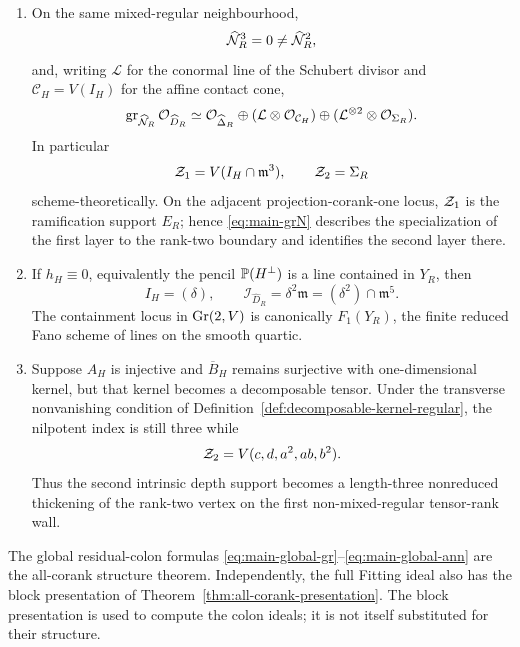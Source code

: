 \begin{theorem}
\begin{enumerate}
\item On the same mixed-regular neighbourhood,
\[
 \widehat{\mathcal N}_R^3=0\ne\widehat{\mathcal N}_R^2,
\]
and, writing \(\mathcal L\) for the conormal line of the Schubert
divisor and \(\mathcal C_H=V(I_H)\) for the affine contact cone,
\begin{equation}\label{eq:main-grN}
 \operatorname{gr}_{\widehat{\mathcal N}_R}\mathcal O_{\widehat D_R}
 \simeq
 \mathcal O_{\widehat\Delta_R}
 \oplus
 (\mathcal L\otimes\mathcal O_{\mathcal C_H})
 \oplus
 (\mathcal L^{\otimes2}\otimes\mathcal O_{\Sigma_R}).
\end{equation}
In particular
\[
 \mathcal Z_1=
 V(I_H\cap\mathfrak m^3),\qquad
 \mathcal Z_2=\Sigma_R
\]
scheme-theoretically.  On the adjacent projection-corank-one locus,
\(\mathcal Z_1\) is the ramification support \(E_R\); hence
\eqref{eq:main-grN} describes the specialization of the first layer
to the rank-two boundary and identifies the second layer there.

\item If \(h_H\equiv0\), equivalently the pencil
\(\mathbb P(H^\perp)\) is a line contained in \(Y_R\), then
\begin{equation}\label{eq:main-containment}
 I_H=(\delta),\qquad
 \mathcal I_{\widehat D_R}
 =\delta^2\mathfrak m
 =(\delta^2)\cap\mathfrak m^5.
\end{equation}
The containment locus in \(\operatorname{Gr}(2,V)\) is canonically
\(F_1(Y_R)\), the finite reduced Fano scheme of lines on the smooth
quartic.

\item Suppose \(A_H\) is injective and \(\overline B_H\) remains
surjective with one-dimensional kernel, but that kernel becomes a
decomposable tensor.  Under the transverse nonvanishing condition of
Definition~\ref{def:decomposable-kernel-regular}, the nilpotent index
is still three while
\[
 \mathcal Z_2=
 V(c,d,a^2,ab,b^2).
\]
Thus the second intrinsic depth support becomes a length-three
nonreduced thickening of the rank-two vertex on the first
non-mixed-regular tensor-rank wall.
\end{enumerate}

The global residual-colon formulas
\eqref{eq:main-global-gr}--\eqref{eq:main-global-ann} are the
all-corank structure theorem.  Independently, the full Fitting ideal
also has the block presentation of
Theorem~\ref{thm:all-corank-presentation}.  The block presentation
is used to compute the colon ideals; it is not itself substituted for
their structure.
\end{theorem}

